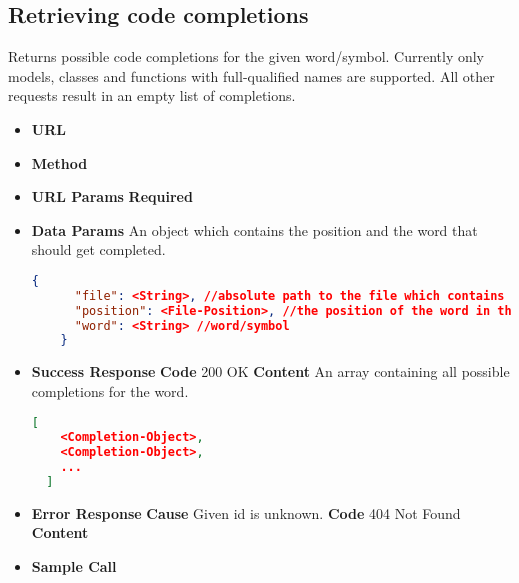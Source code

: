\subsection{Retrieving code completions}
Returns possible code completions for the given word/symbol.
Currently only models, classes and functions with full-qualified names are supported.
All other requests result in an empty list of completions.
\begin{itemize}
\item \textbf{URL} 
\item \textbf{Method} 

\item \textbf{URL Params}
  \newline\textbf{Required} 

\item \textbf{Data Params} An object which contains the position and the word that should get completed.
  \begin{lstlisting}[basicstyle=\small,language=json]
    {
      "file": <String>, //absolute path to the file which contains the word/symbol
      "position": <File-Position>, //the position of the word in the file
      "word": <String> //word/symbol
    }
  \end{lstlisting}

\item \textbf{Success Response}
  \newline\textbf{Code} 200 OK
  \newline\textbf{Content} An array containing all possible completions for the word.
  \begin{lstlisting}[basicstyle=\small,language=json]
  [
    <Completion-Object>,
    <Completion-Object>,
    ...
  ]
  \end{lstlisting}

\item \textbf{Error Response}
  \newline\textbf{Cause} Given id is unknown.
  \newline\textbf{Code} 404 Not Found
  \newline\textbf{Content} 

\item \textbf{Sample Call}
\end{itemize}
